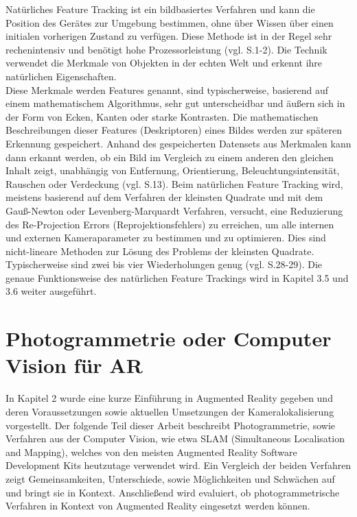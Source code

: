 Natürliches Feature Tracking ist ein bildbasiertes Verfahren und kann die Position des Gerätes zur Umgebung bestimmen, ohne über Wissen über einen initialen vorherigen Zustand zu verfügen. Diese Methode ist in der Regel sehr rechenintensiv und benötigt hohe Prozessorleistung (vgl. \cite{model_based} S.1-2). Die Technik verwendet die Merkmale von Objekten in der echten Welt und erkennt ihre natürlichen Eigenschaften.\\ Diese Merkmale werden \glqq Features\grqq{} genannt, sind typischerweise, basierend auf einem mathematischem Algorithmus, sehr gut unterscheidbar und äußern sich in der Form von Ecken, Kanten oder starke Kontrasten. Die mathematischen Beschreibungen dieser Features (Deskriptoren) eines Bildes werden zur späteren Erkennung gespeichert. Anhand des gespeicherten Datensets aus Merkmalen kann dann erkannt werden, ob ein Bild im Vergleich zu einem anderen den gleichen Inhalt zeigt, unabhängig von Entfernung, Orientierung, Beleuchtungsintensität, Rauschen oder Verdeckung (vgl. \cite{comparative_sdks} S.13). Beim natürlichen Feature Tracking wird, meistens basierend auf dem Verfahren der kleinsten Quadrate und mit dem Gauß-Newton oder Levenberg-Marquardt Verfahren, versucht, eine Reduzierung des \glqq Re-Projection Errors\grqq{} (Reprojektionsfehlers) zu erreichen, um alle internen und externen Kameraparameter zu bestimmen und zu optimieren. Dies sind nicht-lineare Methoden zur Lösung des Problems der kleinsten Quadrate. Typischerweise sind zwei bis vier Wiederholungen genug (vgl. \cite{natural_feature} S.28-29). Die genaue Funktionsweise des natürlichen Feature Trackings wird in Kapitel 3.5 und 3.6 weiter ausgeführt.
 

\section{Photogrammetrie oder Computer Vision für AR}

In Kapitel 2 wurde eine kurze Einführung in Augmented Reality gegeben und deren Voraussetzungen sowie aktuellen Umsetzungen der Kameralokalisierung vorgestellt. Der folgende Teil dieser Arbeit beschreibt Photogrammetrie, sowie Verfahren aus der Computer Vision, wie etwa SLAM (Simultaneous Localisation and Mapping), welches von den meisten Augmented Reality Software Development Kits heutzutage verwendet wird. Ein Vergleich der beiden Verfahren zeigt Gemeinsamkeiten, Unterschiede, sowie Möglichkeiten und Schwächen auf und bringt sie in Kontext. Anschließend wird evaluiert, ob photogrammetrische Verfahren in Kontext von Augmented Reality eingesetzt werden können.

